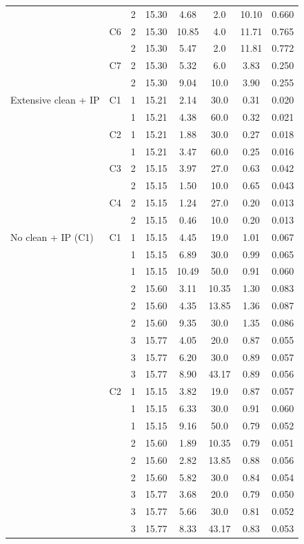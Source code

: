 {\begin{longtable}{llcccccc}
   &  & 2 & 15.30 & 4.68 & 2.0 & 10.10 & 0.660 \\
  \addlinespace[2pt]
   & C6 & 2 & 15.30 & 10.85 & 4.0 & 11.71 & 0.765 \\
   &  & 2 & 15.30 & 5.47 & 2.0 & 11.81 & 0.772 \\
  \addlinespace[2pt]
   & C7 & 2 & 15.30 & 5.32 & 6.0 & 3.83 & 0.250 \\
   &  & 2 & 15.30 & 9.04 & 10.0 & 3.90 & 0.255 \\
  \midrule
  Extensive clean + IP & C1 & 1 & 15.21 & 2.14 & 30.0 & 0.31 & 0.020 \\
   &  & 1 & 15.21 & 4.38 & 60.0 & 0.32 & 0.021 \\
  \addlinespace[2pt]
   & C2 & 1 & 15.21 & 1.88 & 30.0 & 0.27 & 0.018 \\
   &  & 1 & 15.21 & 3.47 & 60.0 & 0.25 & 0.016 \\
  \addlinespace[2pt]
   & C3 & 2 & 15.15 & 3.97 & 27.0 & 0.63 & 0.042 \\
   &  & 2 & 15.15 & 1.50 & 10.0 & 0.65 & 0.043 \\
  \addlinespace[2pt]
   & C4 & 2 & 15.15 & 1.24 & 27.0 & 0.20 & 0.013 \\
   &  & 2 & 15.15 & 0.46 & 10.0 & 0.20 & 0.013 \\
  \midrule
  No clean + IP (C1) & C1 & 1 & 15.15 & 4.45 & 19.0 & 1.01 & 0.067 \\
   &  & 1 & 15.15 & 6.89 & 30.0 & 0.99 & 0.065 \\
   &  & 1 & 15.15 & 10.49 & 50.0 & 0.91 & 0.060 \\
   &  & 2 & 15.60 & 3.11 & 10.35 & 1.30 & 0.083 \\
   &  & 2 & 15.60 & 4.35 & 13.85 & 1.36 & 0.087 \\
   &  & 2 & 15.60 & 9.35 & 30.0 & 1.35 & 0.086 \\
   &  & 3 & 15.77 & 4.05 & 20.0 & 0.87 & 0.055 \\
   &  & 3 & 15.77 & 6.20 & 30.0 & 0.89 & 0.057 \\
   &  & 3 & 15.77 & 8.90 & 43.17 & 0.89 & 0.056 \\
  \addlinespace[2pt]
   & C2 & 1 & 15.15 & 3.82 & 19.0 & 0.87 & 0.057 \\
   &  & 1 & 15.15 & 6.33 & 30.0 & 0.91 & 0.060 \\
   &  & 1 & 15.15 & 9.16 & 50.0 & 0.79 & 0.052 \\
   &  & 2 & 15.60 & 1.89 & 10.35 & 0.79 & 0.051 \\
   &  & 2 & 15.60 & 2.82 & 13.85 & 0.88 & 0.056 \\
   &  & 2 & 15.60 & 5.82 & 30.0 & 0.84 & 0.054 \\
   &  & 3 & 15.77 & 3.68 & 20.0 & 0.79 & 0.050 \\
   &  & 3 & 15.77 & 5.66 & 30.0 & 0.81 & 0.052 \\
   &  & 3 & 15.77 & 8.33 & 43.17 & 0.83 & 0.053 \\
\end{longtable}}

